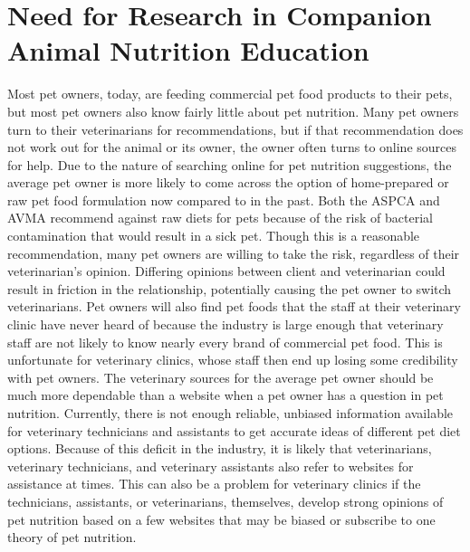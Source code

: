 \section{Need for Research in Companion Animal Nutrition Education}
Most pet owners, today, are feeding commercial pet food products to their pets, but most pet owners also know fairly little about pet nutrition\citep{oconnor}. Many pet owners turn to their veterinarians for recommendations, but if that recommendation does not work out for the animal or its owner, the owner often turns to online sources for help. Due to the nature of searching online for pet nutrition suggestions, the average pet owner is more likely to come across the option of home-prepared or raw pet food formulation now compared to in the past. Both the ASPCA and AVMA recommend against raw diets for pets because of the risk of bacterial contamination that would result in a sick pet\citep{oconnor}. Though this is a reasonable recommendation, many pet owners are willing to take the risk, regardless of their veterinarian's opinion. Differing opinions between client and veterinarian could result in friction in the relationship, potentially causing the pet owner to switch veterinarians. Pet owners will also find pet foods that the staff at their veterinary clinic have never heard of because the industry is large enough that veterinary staff are not likely to know nearly every brand of commercial pet food. This is unfortunate for veterinary clinics, whose staff then end up losing some credibility with pet owners. The veterinary sources for the average pet owner should be much more dependable than a website when a pet owner has a question in pet nutrition. Currently, there is not enough reliable, unbiased information available for veterinary technicians and assistants to get accurate ideas of different pet diet options. Because of this deficit in the industry, it is likely that veterinarians, veterinary technicians, and veterinary assistants also refer to websites for assistance at times. This can also be a problem for veterinary clinics if the technicians, assistants, or veterinarians, themselves, develop strong opinions of pet nutrition based on a few websites that may be biased or subscribe to one theory of pet nutrition.
